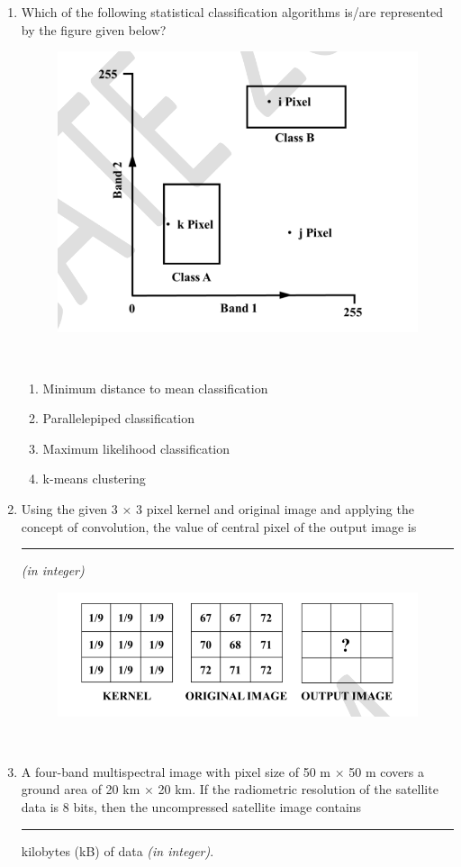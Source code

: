 \documentclass[12pt]{article}
\begin{document}
\begin{enumerate}
\item Which of the following statistical classification algorithms is/are represented by the
figure given below?\\

\begin{figure}[H]
\centering
\includegraphics[width=0.5\linewidth]{Figs/LatexImage12.png}
\end{figure} \\

\begin{enumerate}
    \item Minimum distance to mean classification 
   \item Parallelepiped classification 
   \item Maximum likelihood classification 
   \item k-means clustering 
\end{enumerate}

\item Using the given 3 × 3 pixel kernel and original image and applying the concept of
convolution, the value of central pixel of the output image is \rule{2cm}{0.15mm} \textit{(in integer)}

\begin{figure}[H]
\centering
\includegraphics[width=0.5\linewidth]{Figs/LatexImage13.png}
\end{figure}\\

\item A four-band multispectral image with pixel size of 50 m × 50 m covers a ground
area of 20 km × 20 km. If the radiometric resolution of the satellite data is 8 bits,
then the uncompressed satellite image contains\rule{2cm}{0.15mm}  kilobytes (kB) of data \textit{(in integer)}.


\end{enumerate}
\end{document}
